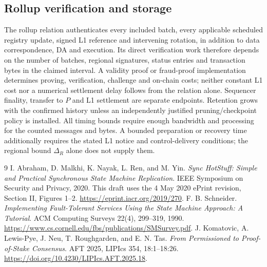 \documentclass[11pt,a4paper,onecolumn]{article}
\begin{document}
\subsection{Rollup verification and storage}
The rollup relation authenticates every included batch, every applicable
scheduled registry update, signed L1 reference and intervening rotation, in addition to data
correspondence, DA and execution. Its direct verification work therefore
depends on the number of batches, regional signatures, status entries and
transaction bytes in the claimed interval. A validity proof or fraud-proof
implementation determines proving, verification, challenge and on-chain
costs; neither constant L1 cost nor a numerical settlement delay follows
from the relation alone. Sequencer finality, transfer to $P$ and L1
settlement are separate endpoints. Retention grows with the confirmed
history unless an independently justified pruning/checkpoint policy is
installed. All timing bounds require enough bandwidth and processing for
the counted messages and bytes. A bounded preparation or recovery time
additionally requires the stated L1 notice and control-delivery conditions;
the regional bound $\Delta_R$ alone does not supply them.

\begin{thebibliography}{9}\small
\setlength{\itemsep}{3pt}
I. Abraham, D. Malkhi, K. Nayak, L. Ren, and M. Yin.
\emph{Sync HotStuff: Simple and Practical Synchronous State Machine Replication}.
IEEE Symposium on Security and Privacy, 2020.
This draft uses the 4 May 2020 ePrint revision, Section II, Figures 1--2.
\url{https://eprint.iacr.org/2019/270}.
F. B. Schneider.
\emph{Implementing Fault-Tolerant Services Using the State Machine Approach:
A Tutorial}. ACM Computing Surveys 22(4), 299--319, 1990.
\url{https://www.cs.cornell.edu/fbs/publications/SMSurvey.pdf}.
J. Komatovic, A. Lewis-Pye, J. Neu, T. Roughgarden, and E. N. Tas.
\emph{From Permissioned to Proof-of-Stake Consensus}.
AFT 2025, LIPIcs 354, 18:1--18:26.
\url{https://doi.org/10.4230/LIPIcs.AFT.2025.18}.
\end{thebibliography}
\end{document}
